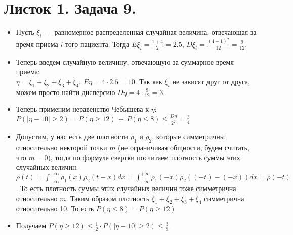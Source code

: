 



\section*{Листок 1. Задача 9.}
\begin{itemize}
    \item Пусть $\xi_{i} \ -$ равномерное распределенная случайная величина, отвечающая за время приема $i$-того пациента. Тогда $E \xi_{i} = \frac{1 + 4}{2} = 2.5$, $D \xi_{i} = \frac{\left(4 - 1 \right) ^ 2}{12} = \frac{9}{12}$.
    \item Теперь введем случайную величину, отвечающую за суммарное время приема:\\ $\eta = \xi_{1} + \xi_{2} + \xi_{3} + \xi_{4}$. $E\eta = 4 \cdot 2.5 = 10$. Так как $\xi_{i}$ не зависят друг от друга, можем просто найти дисперсию $D \eta = 4 \cdot \frac{9}{12} = 3$. 
    \item Теперь применим неравенство Чебышева к $\eta$: \\ $P\left(\left| \eta - 10\right| \geq 2\right) = P\left(\eta \geq 12\right) \, + \, P\left(\eta \leq 8\right) \leq \frac{D \eta}{2 ^ 2} = \frac{3}{4}$
    \item Допустим, у нас есть две плотности $\rho_{1}$ и $\rho_{2}$, которые симметричны относительно некторой точки $m$ (не ограничивая общности, будем считать, что $m = 0$), тогда по формуле свертки посчитаем плотность суммы этих случайных величин: $\rho\left(t\right) = \int_{- \infty}^{+ \infty} \rho_{1}\left(x\right) \rho_{2}\left(t - x\right) dx = \int_{- \infty}^{+ \infty} \rho_{1}\left(-x\right) \rho_{2}\left((-t) - (-x)\right)dx = \rho\left(-t \right)$. То есть плотность суммы этих случайных величин тоже симметрична относительно $m$. Таким образом плотность $\xi_{1} + \xi_{2} + \xi_{3} + \xi_{4}$ симметрична относительно 10. То есть $P\left(\eta \leq 8\right) = P\left(\eta \geq 12\right)$
    \item Получаем $P\left(\eta \geq 12 \right) \leq \frac{1}{2} \cdot P\left(\left| \eta - 10\right| \geq 2\right) \leq \frac{3}{8}$.
\end{itemize}
